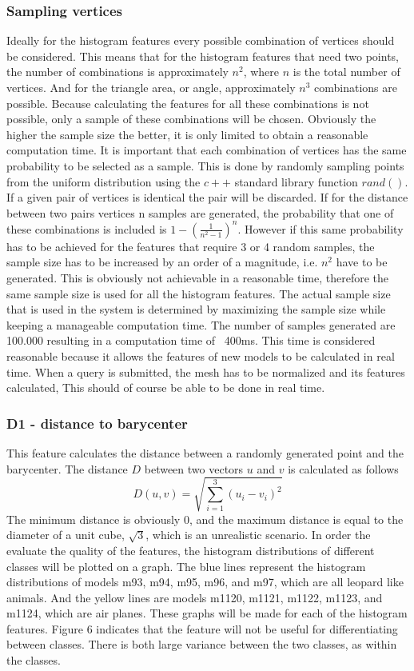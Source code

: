 \documentclass{bigdata}
\begin{document}
\subsubsection{Sampling vertices}
Ideally for  the histogram features every possible combination of vertices should be considered. This means that for the histogram features that need two points, the number of combinations is approximately $n^2$, where $n$ is the total number of vertices. And for the triangle area, or angle, approximately $n^3$ combinations are possible. Because calculating the features for all these combinations is not possible, only a sample of these combinations will be chosen. Obviously the higher the sample size the better, it is only limited to obtain a reasonable computation time.
It is important that each combination of vertices has the same probability to be selected as a sample. This is done by randomly sampling points from the uniform distribution using the $c++$ standard library function $rand()$. If a given pair of vertices is identical the pair will be discarded. 
If for the distance between two pairs vertices n samples are generated, the probability that one of these combinations is included is $1-(\frac{1}{n^2 - 1})^{n}$. However if this same probability has to be achieved for the features that require 3 or 4 random samples, the sample size has to be increased by an order of a magnitude, i.e.
$n^2$ have to be generated. This is obviously not achievable in a reasonable time, therefore the same sample size is used for all the histogram features.
The actual sample size that is used in the system is determined by maximizing the sample size while keeping a manageable computation time. The number of samples generated are 100.000 resulting in a computation time of ~400ms. This time is considered reasonable because it allows the features of new models to be calculated in real time. When a query is submitted, the mesh has to be normalized and its features calculated, This should of course be able to be done in real time.

\subsubsection{D1 - distance to barycenter}
This feature calculates the distance between a randomly generated point and the barycenter. The distance $D$ between two vectors $u$ and $v$ is calculated as follows
\begin{equation}
D(u,v) = \sqrt{\sum\limits_{i=1}^3 (u_i - v_i)^2}
\end{equation}
The minimum distance is obviously 0, and the maximum distance is equal to the diameter of a unit cube, $\sqrt{3}$, which is an unrealistic scenario.
In order the evaluate the quality of the features, the histogram distributions of different classes will be plotted on a graph. The blue lines represent the histogram distributions of models m93, m94, m95, m96, and m97, which are all leopard like animals. And the yellow lines are models m1120, m1121, m1122, m1123, and m1124, which are air planes. These graphs will be made for each of the histogram features. 
Figure 6 indicates that the feature will not be useful for differentiating between classes. There is both large variance between the two classes, as within the classes.
\end{document}
